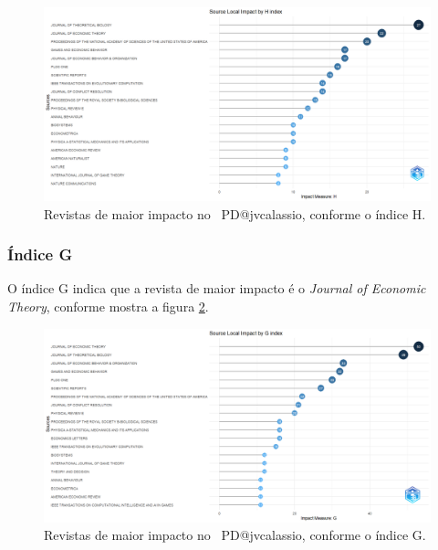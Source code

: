 \begin{figure}
    \centering
    \includegraphics[width=1\textwidth]{exploratory-data-analysis/jvcalassio/PesqBibliogr/PrisonersDilemma/WoS-20221201/Dataset/SourceImpactH-2022-12-03.png}
    \caption{Revistas de maior impacto no  \dataset\ PD@jvcalassio,  conforme o índice H.}
    \label{fig:PD@jvcalassio:H-Index-Source-Local-Impact.png}
\end{figure}


\subsubsection{Índice G}

O índice G indica que a revista de maior impacto é o \textit{Journal of Economic Theory}, conforme mostra a figura \ref{fig:PD@jvcalassio:G-Index-Source-Local-Impact.png}.

\begin{figure}
    \centering
    \includegraphics[width=1\textwidth]{exploratory-data-analysis/jvcalassio/PesqBibliogr/PrisonersDilemma/WoS-20221201/Dataset/SourceImpactG-2022-12-03.png}
    \caption{Revistas de maior impacto no  \dataset\ PD@jvcalassio,  conforme o índice G.}
    \label{fig:PD@jvcalassio:G-Index-Source-Local-Impact.png}
\end{figure}

